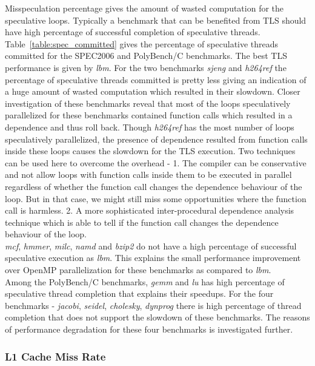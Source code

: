 \documentclass[10pt]{report}          %
\begin{document}
Misspeculation percentage gives the amount of wasted computation for the speculative loops.  Typically a benchmark that can be benefited from TLS should have high percentage of successful completion of speculative threads. Table~\ref{table:spec_committed} gives the percentage of speculative threads committed for the SPEC2006 and PolyBench/C benchmarks.  The best TLS performance is given by \textit{lbm}.  For the two benchmarks \textit{sjeng} and \textit{h264ref} the percentage of speculative threads committed is pretty less giving an indication of a huge amount of wasted computation which resulted in their slowdown.  Closer investigation of these benchmarks reveal that most of the loops speculatively parallelized for these benchmarks contained function calls which resulted in a dependence and thus roll back.  Though \textit{h264ref} has the most number of loops speculatively parallelized, the presence of dependence resulted from function calls inside these loops causes the slowdown for the TLS execution.  Two techniques can be used here to overcome the overhead - 1. The compiler can be conservative and not allow loops with function calls inside them to be executed in parallel regardless of whether the function call changes the dependence behaviour of the loop.  But in that case, we might still miss some opportunities where the function call is harmless.  2. A more sophisticated inter-procedural dependence analysis technique which is able to tell if the function call changes the dependence behaviour of the loop.\\

\textit{mcf}, \textit{hmmer}, \textit{milc}, \textit{namd} and \textit{bzip2} do not have a high percentage of successful speculative execution as \textit{lbm}. This explains the small performance improvement over OpenMP parallelization for these benchmarks as compared to \textit{lbm}. \\

Among the PolyBench/C benchmarks, \textit{gemm} and \textit{lu} has high percentage of speculative thread completion that explains their speedups.  For the four benchmarks - \textit{jacobi}, \textit{seidel}, \textit{cholesky}, \textit{dynprog} there is high percentage of thread completion that does not support the slowdown of these benchmarks.  The reasons of performance degradation for these four benchmarks is investigated further.

\subsubsection{L1 Cache Miss Rate}
\end{document}
